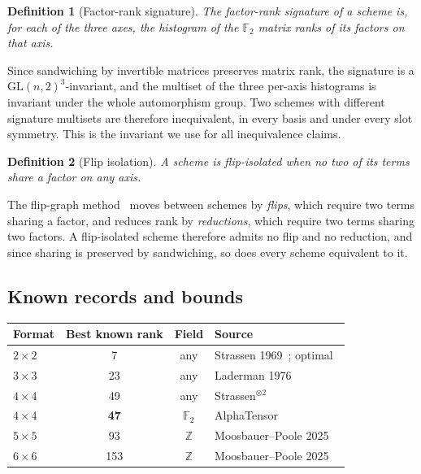 \documentclass[11pt]{article}
\newtheorem{definition}{Definition}
\newcommand{\FF}{\mathbb{F}_2}
\newcommand{\GL}{\mathrm{GL}}
\begin{document}
\begin{definition}[Factor-rank signature]
The \emph{factor-rank signature} of a scheme is, for each of the three axes, the histogram of the $\FF$
matrix ranks of its factors on that axis.
\end{definition}

Since sandwiching by invertible matrices preserves matrix rank, the signature is a
$\GL(n,2)^3$-invariant, and the multiset of the three per-axis histograms is invariant under the whole
automorphism group. Two schemes with different signature multisets are therefore inequivalent, in every
basis and under every slot symmetry. This is the invariant we use for all inequivalence claims.

\begin{definition}[Flip isolation]
A scheme is \emph{flip-isolated} when no two of its terms share a factor on any axis.
\end{definition}

The flip-graph method~\cite{Kauers2022} moves between schemes by \emph{flips}, which require two terms
sharing a factor, and reduces rank by \emph{reductions}, which require two terms sharing two factors. A
flip-isolated scheme therefore admits no flip and no reduction, and since sharing is preserved by
sandwiching, so does every scheme equivalent to it.

\subsection{Known records and bounds}

\begin{center}
\begin{tabular}{lccl}
\toprule
Format & Best known rank & Field & Source \\
\midrule
$2\times2$ & 7 & any & Strassen 1969~\cite{Strassen1969}; optimal~\cite{Winograd1971} \\
$3\times3$ & 23 & any & Laderman 1976~\cite{Laderman1976} \\
$4\times4$ & 49 & any & Strassen$^{\otimes2}$ \\
$4\times4$ & \textbf{47} & $\FF$ & AlphaTensor~\cite{Fawzi2022} \\
$5\times5$ & 93 & $\mathbb{Z}$ & Moosbauer--Poole 2025~\cite{Moosbauer2025} \\
$6\times6$ & 153 & $\mathbb{Z}$ & Moosbauer--Poole 2025~\cite{Moosbauer2025} \\
\bottomrule
\end{tabular}
\end{center}
\end{document}
